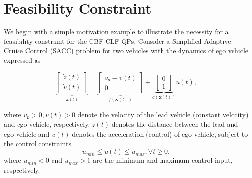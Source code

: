 \documentclass[letterpaper, 10 pt, conference]{ieeeconf}
\theoremstyle{definition}
\begin{document}
\section{Feasibility Constraint}
\label{sec:Feasibility Constraint}

We begin with a simple motivation example to illustrate the necessity for a feasibility constraint for the CBF-CLF-QPs. Consider a Simplified Adaptive Cruise Control (SACC) problem for two vehicles with the dynamics of ego vehicle expressed as 
\begin{small}
\begin{equation}
\label{eq:SACC-dynamics}
\underbrace{\begin{bmatrix}
\dot{z}(t) \\
\dot{v}(t) 
\end{bmatrix}}_{\dot{\boldsymbol{x}}(t)}  
=\underbrace{\begin{bmatrix}
 v_{p}-v(t) \\
 0
\end{bmatrix}}_{f(\boldsymbol{x}(t))} 
+ \underbrace{\begin{bmatrix}
  0 \\
  1 
\end{bmatrix}}_{g(\boldsymbol{x}(t))}u(t),
\end{equation}
\end{small}
where $v_{p}>0, v(t)>0$ denote the velocity of the lead vehicle (constant velocity) and ego vehicle, respectively. $z(t)$ denotes the distance between the lead and ego vehicle and $u(t)$ denotes the acceleration (control) of ego vehicle, subject to the control constraints
\begin{equation}
\label{eq:simple-control-constraint}
u_{min}\le u(t) \le u_{max}, \forall t \ge0,
\end{equation}
where $u_{min}<0$ and $u_{max}>0$ are the minimum and maximum control input, respectively.
\end{document}
